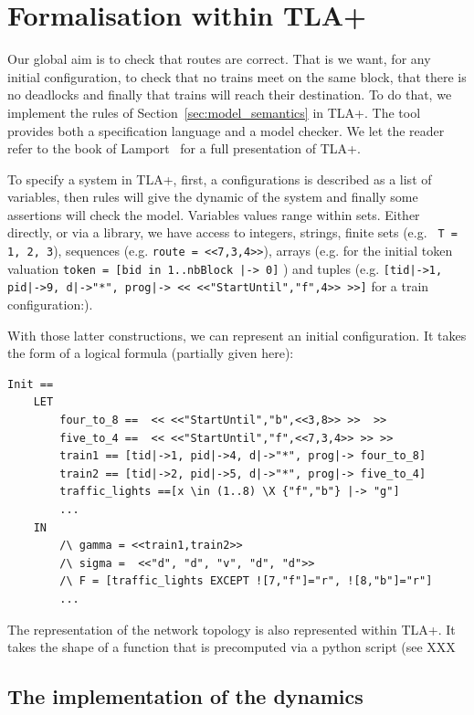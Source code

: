 \documentclass[runningheads]{llncs}
\begin{document}
\section{Formalisation within TLA+}
\label{sec:tla-formalisation}

Our global aim is to check that routes are correct. That is we want, for any initial configuration, to check that no trains meet on the same block, that there is no deadlocks and finally  that trains will reach their destination. To do that, we implement the rules of Section~\ref{sec:model_semantics} in TLA+. The tool provides both a specification language and a model checker. We let the reader refer to the book of Lamport~\cite{Lamport} for a full presentation of TLA+. 

To specify a system in TLA+, first, a configurations is described as a list of variables, then rules  will give the dynamic of the system and finally some assertions  will check the model.  Variables values range within sets. Either directly, or via a library, we have access to integers, strings, finite sets (e.g. \texttt{ T = {1, 2, 3}}), sequences (e.g. \texttt{route = <<7,3,4>>}),  arrays (e.g. for the initial token valuation \texttt{token = [bid in 1..nbBlock |-> 0]} ) and tuples (e.g. \texttt{[tid|->1, pid|->9, d|->"*", prog|-> << <<"StartUntil","f",4>> >>]}  for a train configuration:).

With those latter constructions, we can represent an initial configuration. It takes the form of a logical formula (partially given here):
\begin{verbatim}
Init == 
    LET 
        four_to_8 ==  << <<"StartUntil","b",<<3,8>> >>  >>
        five_to_4 ==  << <<"StartUntil","f",<<7,3,4>> >> >>
        train1 == [tid|->1, pid|->4, d|->"*", prog|-> four_to_8]
        train2 == [tid|->2, pid|->5, d|->"*", prog|-> five_to_4]
        traffic_lights ==[x \in (1..8) \X {"f","b"} |-> "g"]
        ...
    IN
        /\ gamma = <<train1,train2>>
        /\ sigma =  <<"d", "d", "v", "d", "d">> 
        /\ F = [traffic_lights EXCEPT ![7,"f"]="r", ![8,"b"]="r"]
        ...
\end{verbatim}

The representation of the network topology is also represented within TLA+. It takes the shape of a function that is precomputed via a python script (see XXX%

\subsection{The implementation of the dynamics}
\end{document}
